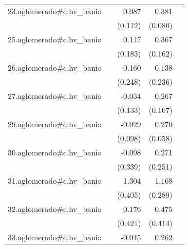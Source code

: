 {\begin{longtable}{l*{4}{D{.}{.}{-1}}}
\addlinespace
23.aglomerado#c.hv\_banio&                     &       0.087         &       0.381\sym{***}&                     \\
            &                     &     (0.112)         &     (0.080)         &                     \\
\addlinespace
25.aglomerado#c.hv\_banio&                     &       0.117         &       0.367\sym{*}  &                     \\
            &                     &     (0.183)         &     (0.162)         &                     \\
\addlinespace
26.aglomerado#c.hv\_banio&                     &      -0.160         &       0.138         &                     \\
            &                     &     (0.248)         &     (0.236)         &                     \\
\addlinespace
27.aglomerado#c.hv\_banio&                     &      -0.034         &       0.267\sym{*}  &                     \\
            &                     &     (0.133)         &     (0.107)         &                     \\
\addlinespace
29.aglomerado#c.hv\_banio&                     &      -0.029         &       0.270\sym{***}&                     \\
            &                     &     (0.098)         &     (0.058)         &                     \\
\addlinespace
30.aglomerado#c.hv\_banio&                     &      -0.098         &       0.271         &                     \\
            &                     &     (0.339)         &     (0.251)         &                     \\
\addlinespace
31.aglomerado#c.hv\_banio&                     &       1.304\sym{**} &       1.168\sym{***}&                     \\
            &                     &     (0.405)         &     (0.289)         &                     \\
\addlinespace
32.aglomerado#c.hv\_banio&                     &       0.176         &       0.475         &                     \\
            &                     &     (0.421)         &     (0.414)         &                     \\
\addlinespace
33.aglomerado#c.hv\_banio&                     &      -0.045         &       0.262\sym{***}&                     \\

\end{longtable}}
